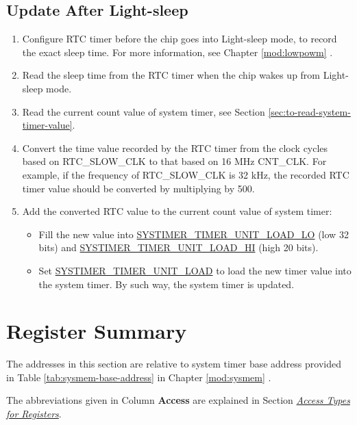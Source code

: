 \documentclass[main\_\_EN.tex]{subfiles}
\begin{document}
\subsection{Update After Light-sleep}
\begin{enumerate}
    \item Configure RTC timer before the chip goes into Light-sleep mode, to record the exact sleep time. For more information, see Chapter \ref{mod:lowpowm} \textit{}.
    \item Read the sleep time from the RTC timer when the chip wakes up from Light-sleep mode.
    \item Read the current count value of system timer, see Section \ref{sec:to-read-system-timer-value}.
    \item Convert the time value recorded by the RTC timer from the clock cycles based on RTC\_SLOW\_CLK to that based on 16 MHz CNT\_CLK. For example, if the frequency of RTC\_SLOW\_CLK is 32 kHz, the recorded RTC timer value should be converted by multiplying by 500.
    \item Add the converted RTC value to the current count value of system timer:
    \begin{itemize}
        \item Fill the new value into \hyperref[fielddesc:SYSTIMERTIMERUNIT0LOADLO]{SYSTIMER\_TIMER\_UNIT\_LOAD\_LO} (low 32 bits) and \hyperref[fielddesc:SYSTIMERTIMERUNIT0LOADHI]{SYSTIMER\_TIMER\_UNIT\_LOAD\_HI} (high 20 bits).
        \item Set \hyperref[fielddesc:SYSTIMERTIMERUNIT0LOAD]{SYSTIMER\_TIMER\_UNIT\_LOAD} to load the new timer value into the system timer. By such way, the system timer is updated.    \end{itemize}
\end{enumerate}



\clearpage
\hypertarget{systimer-summ}{}
\section{Register Summary}
\label{sec:28-systimer-reg-summ}

The addresses in this section are relative to system timer base address provided in Table \ref{tab:sysmem-base-address} in Chapter \ref{mod:sysmem} \textit{}.

The abbreviations given in Column \textbf{Access} are explained in Section \hyperref[glossary-access-types]{\textit{Access Types for Registers}}.
\end{document}
